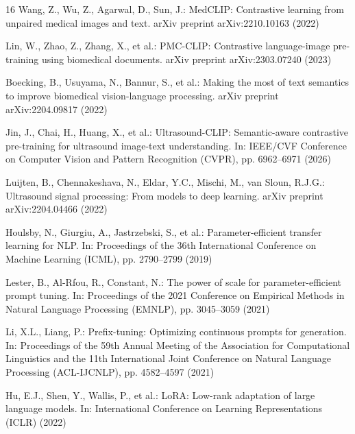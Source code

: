 \documentclass[runningheads]{llncs}
\begin{document}
\begin{thebibliography}{16}
Wang, Z., Wu, Z., Agarwal, D., Sun, J.: MedCLIP: Contrastive learning from unpaired medical images and text. arXiv preprint arXiv:2210.10163 (2022)

Lin, W., Zhao, Z., Zhang, X., et al.: PMC-CLIP: Contrastive language-image pre-training using biomedical documents. arXiv preprint arXiv:2303.07240 (2023)

Boecking, B., Usuyama, N., Bannur, S., et al.: Making the most of text semantics to improve biomedical vision-language processing. arXiv preprint arXiv:2204.09817 (2022)

Jin, J., Chai, H., Huang, X., et al.: Ultrasound-CLIP: Semantic-aware contrastive pre-training for ultrasound image-text understanding. In: IEEE/CVF Conference on Computer Vision and Pattern Recognition (CVPR), pp. 6962--6971 (2026)

Luijten, B., Chennakeshava, N., Eldar, Y.C., Mischi, M., van Sloun, R.J.G.: Ultrasound signal processing: From models to deep learning. arXiv preprint arXiv:2204.04466 (2022)


Houlsby, N., Giurgiu, A., Jastrzebski, S., et al.: Parameter-efficient transfer learning for NLP. In: Proceedings of the 36th International Conference on Machine Learning (ICML), pp. 2790--2799 (2019)

Lester, B., Al-Rfou, R., Constant, N.: The power of scale for parameter-efficient prompt tuning. In: Proceedings of the 2021 Conference on Empirical Methods in Natural Language Processing (EMNLP), pp. 3045--3059 (2021)

Li, X.L., Liang, P.: Prefix-tuning: Optimizing continuous prompts for generation. In: Proceedings of the 59th Annual Meeting of the Association for Computational Linguistics and the 11th International Joint Conference on Natural Language Processing (ACL-IJCNLP), pp. 4582--4597 (2021)

Hu, E.J., Shen, Y., Wallis, P., et al.: LoRA: Low-rank adaptation of large language models. In: International Conference on Learning Representations (ICLR) (2022)

\end{thebibliography}
\end{document}
